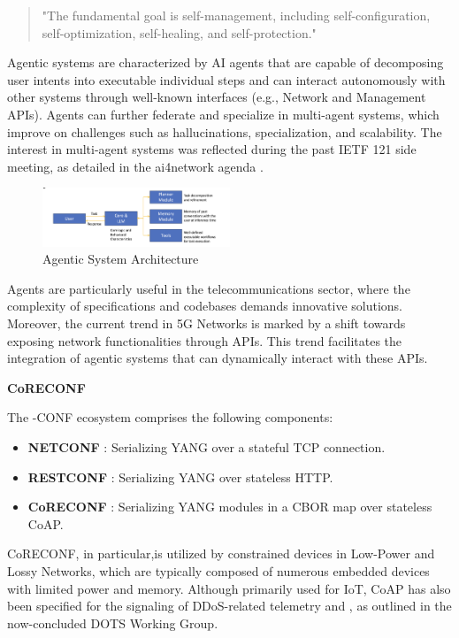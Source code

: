 \documentclass[11pt,sigconf]{iabart}
\begin{document}
\begin{quote}
"The fundamental goal is self-management, including self-configuration, self-optimization, self-healing, and self-protection." \cite{RFC7575}
\end{quote}

Agentic systems are characterized by AI agents that are capable of decomposing user intents into executable individual steps and can interact autonomously with other systems through well-known interfaces (e.g., Network and Management APIs). Agents can further federate and specialize in multi-agent systems, which improve on challenges such as hallucinations, specialization, and scalability. The interest in multi-agent systems was reflected during the past IETF 121 side meeting, as detailed in the ai4network agenda \cite{ai4network-agenda}. 

\begin{figure}[h]
  \centering
  \includegraphics[width=0.5\textwidth]{figs/agent.png}
  \caption{Agentic System Architecture}
  \label{fig:agent_architecture}
\end{figure}

Agents are particularly useful in the telecommunications sector, where the complexity of specifications and codebases demands innovative solutions. Moreover, the current trend in 5G Networks is marked by a shift towards exposing network functionalities through APIs. This trend facilitates the integration of agentic systems that can dynamically interact with these APIs.

\textbf{CoRECONF}

The -CONF ecosystem comprises the following components:
\begin{itemize}
  \item \textbf{NETCONF} \cite{RFC6241}: Serializing YANG over a stateful TCP connection.    
  \item \textbf{RESTCONF} \cite{RFC8040}: Serializing YANG over stateless HTTP.
  \item \textbf{CoRECONF} \cite{draft-ietf-core-comi}: Serializing YANG modules in a CBOR \cite{RFC9254} map over stateless CoAP.
\end{itemize}

CoRECONF, in particular,is utilized by constrained devices in Low-Power and Lossy Networks, which are typically composed of numerous embedded devices with limited power and memory. Although primarily used for IoT, CoAP has also been specified for the signaling of DDoS-related telemetry \cite{RFC9132} and \cite{RFC9362}, as outlined in the now-concluded DOTS Working Group. 
\end{document}
